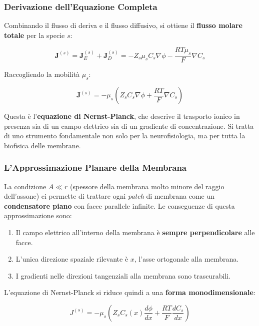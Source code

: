 \subsubsection{Derivazione dell'Equazione Completa}

Combinando il flusso di deriva e il flusso diffusivo, si ottiene il \textbf{flusso molare totale} per la specie $s$:

\begin{equation}
\mathbf{J}^{(s)} = \mathbf{J}_E^{(s)} + \mathbf{J}_D^{(s)} = -Z_s \mu_s C_s \nabla\phi - \frac{RT\mu_s}{F} \nabla C_s
\end{equation}

Raccogliendo la mobilità $\mu_s$:

\begin{equation}
\boxed{\mathbf{J}^{(s)} = -\mu_s \left( Z_s C_s \nabla\phi + \frac{RT}{F} \nabla C_s \right)}
\end{equation}

Questa è l'\textbf{equazione di Nernst-Planck}, che descrive il trasporto ionico in presenza sia di un campo elettrico sia di un gradiente di concentrazione. Si tratta di uno strumento fondamentale non solo per la neurofisiologia, ma per tutta la biofisica delle membrane.

\subsubsection{L'Approssimazione Planare della Membrana}

La condizione $A \ll r$ (spessore della membrana molto minore del raggio dell'assone) ci permette di trattare ogni \textit{patch} di membrana come un \textbf{condensatore piano} con facce parallele infinite. Le conseguenze di questa approssimazione sono:

\begin{enumerate}
    \item Il campo elettrico all'interno della membrana è \textbf{sempre perpendicolare} alle facce.
    \item L'unica direzione spaziale rilevante è $x$, l'asse ortogonale alla membrana.
    \item I gradienti nelle direzioni tangenziali alla membrana sono trascurabili.
\end{enumerate}

L'equazione di Nernst-Planck si riduce quindi a una \textbf{forma monodimensionale}:

\begin{equation}
\boxed{J^{(s)} = -\mu_s \left( Z_s C_s(x) \frac{d\phi}{dx} + \frac{RT}{F} \frac{dC_s}{dx} \right)}
\end{equation}

